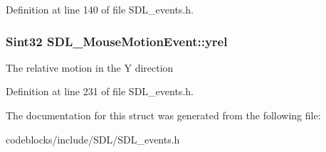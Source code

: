 Definition at line 140 of file S\+D\+L\+\_\+events.\+h.

\hypertarget{structSDL__MouseMotionEvent_a7674c8b92d039ab948f671a180fa7b30}{
\subsubsection[{yrel}]{\setlength{\rightskip}{0pt plus 5cm}Sint32 S\+D\+L\+\_\+\+Mouse\+Motion\+Event\+::yrel}}\label{structSDL__MouseMotionEvent_a7674c8b92d039ab948f671a180fa7b30}
The relative motion in the Y direction 

Definition at line 231 of file S\+D\+L\+\_\+events.\+h.



The documentation for this struct was generated from the following file\+:\begin{DoxyCompactItemize}
\item 
codeblocks/include/\+S\+D\+L/S\+D\+L\+\_\+events.\+h\end{DoxyCompactItemize}
